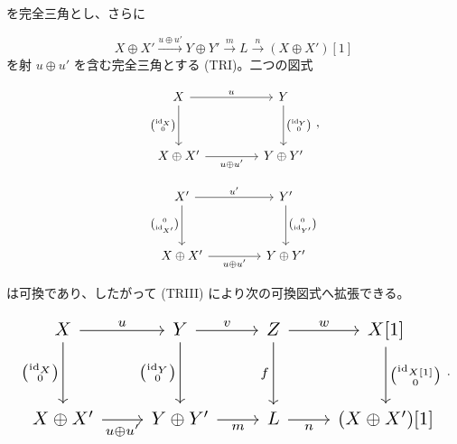 \clearpage
{}%
\begingroup
\small
\setlength{\abovedisplayskip}{4pt plus 2pt minus 2pt}%
\setlength{\belowdisplayskip}{4pt plus 2pt minus 2pt}%

を完全三角とし、さらに

\[
  X\oplus X'\xrightarrow{u\oplus u'}Y\oplus Y'
  \xrightarrow{m}L\xrightarrow{n}(X\oplus X')[1]
\]
を射 $u\oplus u'$ を含む完全三角とする (TRI)。二つの図式

\begin{equation*}
  \begin{tikzcd}[column sep=4.2em,row sep=3.2em]
    X \arrow[r,"u"] \arrow[d,"{\binom{\operatorname{id}_X}{0}}"']
      & Y \arrow[d,"{\binom{\operatorname{id}_Y}{0}}"] \\
    X\oplus X' \arrow[r,"{u\oplus u'}"']
      & Y\oplus Y'
  \end{tikzcd}
  \,,
\end{equation*}

\begin{equation*}
  \begin{tikzcd}[column sep=4.2em,row sep=3.2em]
    X' \arrow[r,"{u'}"] \arrow[d,"{\binom{0}{\operatorname{id}_{X'}}}"']
      & Y' \arrow[d,"{\binom{0}{\operatorname{id}_{Y'}}}"] \\
    X\oplus X' \arrow[r,"{u\oplus u'}"']
      & Y\oplus Y'
  \end{tikzcd}
\end{equation*}

は可換であり、したがって (TRIII) により次の可換図式へ拡張できる。

\begin{equation*}
  \resizebox{0.98\linewidth}{!}{%
    $\begin{tikzcd}[ampersand replacement=\&,column sep=2.25em,row sep=3.1em]
      X \arrow[r,"u"] \arrow[d,"{\binom{\operatorname{id}_X}{0}}"']
        \& Y \arrow[r,"v"] \arrow[d,"{\binom{\operatorname{id}_Y}{0}}"']
        \& Z \arrow[r,"w"] \arrow[d,"f"']
        \& X[1] \arrow[d,"{\binom{\operatorname{id}_{X[1]}}{0}}"] \\
      X\oplus X' \arrow[r,"{u\oplus u'}"']
        \& Y\oplus Y' \arrow[r,"m"']
        \& L \arrow[r,"n"']
        \& (X\oplus X')[1]
    \end{tikzcd}$%
  }\,.
\end{equation*}

